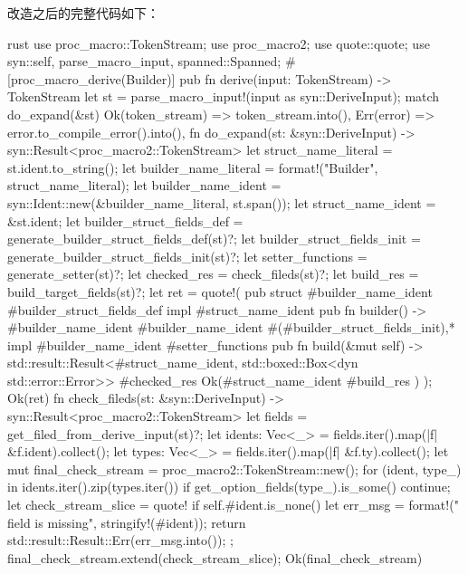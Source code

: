 改造之后的完整代码如下：
\begin{code-block}{rust}
use proc_macro::TokenStream;
use proc_macro2;
use quote::quote;
use syn::{self, parse_macro_input, spanned::Spanned};
#[proc_macro_derive(Builder)]
pub fn derive(input: TokenStream) -> TokenStream {
    let st = parse_macro_input!(input as syn::DeriveInput);
    match do_expand(&st) {
        Ok(token_stream) => token_stream.into(),
        Err(error) => error.to_compile_error().into(),
    }
}
fn do_expand(st: &syn::DeriveInput) -> syn::Result<proc_macro2::TokenStream> {
    let struct_name_literal = st.ident.to_string();
    let builder_name_literal = format!("{}Builder", struct_name_literal);
    let builder_name_ident = syn::Ident::new(&builder_name_literal, st.span());
    let struct_name_ident = &st.ident;
    let builder_struct_fields_def = generate_builder_struct_fields_def(st)?;
    let builder_struct_fields_init = generate_builder_struct_fields_init(st)?;
    let setter_functions = generate_setter(st)?;
    let checked_res = check_fileds(st)?;
    let build_res = build_target_fields(st)?;
    let ret = quote!(
        pub struct #builder_name_ident {
            #builder_struct_fields_def
        }
        impl #struct_name_ident {
            pub fn builder() -> #builder_name_ident {
                #builder_name_ident {
                    #(#builder_struct_fields_init),*
                }
            }
        }
        impl #builder_name_ident {
            #setter_functions
            pub fn build(&mut self) -> std::result::Result<#struct_name_ident, std::boxed::Box<dyn std::error::Error>>{
                #checked_res
                Ok(#struct_name_ident {
                    #build_res
                })
            }
        }
    );
    Ok(ret)
}
fn check_fileds(st: &syn::DeriveInput) -> syn::Result<proc_macro2::TokenStream> {
    let fields = get_filed_from_derive_input(st)?;
    let idents: Vec<_> = fields.iter().map(|f| &f.ident).collect();
    let types: Vec<_> = fields.iter().map(|f| &f.ty).collect();
    let mut final_check_stream = proc_macro2::TokenStream::new();
    for (ident, type_) in idents.iter().zip(types.iter()) {
        if get_option_fields(type_).is_some() {
            continue;
        }
        let check_stream_slice = quote! {
            if self.#ident.is_none() {
                let err_msg = format!("{} field is missing", stringify!(#ident));
                return std::result::Result::Err(err_msg.into());
            }
        };
        final_check_stream.extend(check_stream_slice);
    }
    Ok(final_check_stream)
}

\end{code-block}
